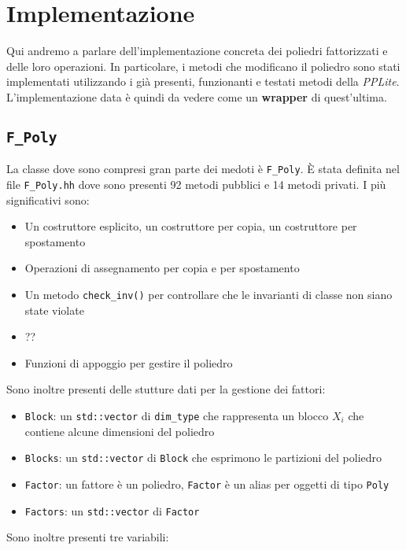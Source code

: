 \documentclass{mimosis}
\theoremstyle{definition}
\begin{document}
\chapter{Implementazione}
\label{sec:orgff5a2ee}
Qui andremo a parlare dell'implementazione concreta dei poliedri fattorizzati e
delle loro operazioni. In particolare, i metodi che modificano il poliedro
sono stati implementati utilizzando i già presenti, funzionanti e testati metodi
della \emph{PPLite}. L'implementazione data è quindi da vedere come un \textbf{wrapper} di
quest'ultima.

\section{\texttt{F\_Poly}}
\label{sec:org9f19af6}
La classe dove sono compresi gran parte dei medoti è \texttt{F\_Poly}. È stata
definita nel file \texttt{F\_Poly.hh} dove sono presenti 92 metodi pubblici e 14 metodi
privati. I più significativi sono:

\begin{itemize}
\item Un costruttore esplicito, un costruttore per copia, un costruttore per spostamento
\item Operazioni di assegnamento per copia e per spostamento
\item Un metodo \texttt{check\_inv()} per controllare che le invarianti di classe non siano
state violate
\item ??
\item Funzioni di appoggio per gestire il poliedro
\end{itemize}

Sono inoltre presenti delle stutture dati per la gestione dei fattori:

\begin{itemize}
\item \texttt{Block}: un \texttt{std::vector} di \texttt{dim\_type} che rappresenta un blocco \(X_i\) che
contiene alcune dimensioni del poliedro
\item \texttt{Blocks}: un \texttt{std::vector} di \texttt{Block} che esprimono le partizioni del poliedro
\item \texttt{Factor}: un fattore è un poliedro, \texttt{Factor} è un alias per oggetti di tipo \texttt{Poly}
\item \texttt{Factors}: un \texttt{std::vector} di \texttt{Factor}
\end{itemize}

Sono inoltre presenti tre variabili:
\end{document}
